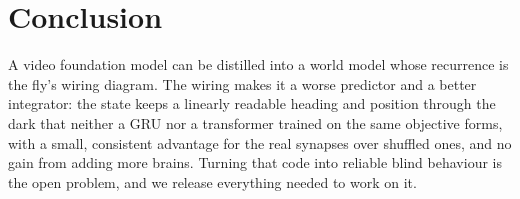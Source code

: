 \section{Conclusion}
A video foundation model can be distilled into a world model whose recurrence is the fly's wiring diagram. The wiring
makes it a worse predictor and a better integrator: the state keeps a linearly readable heading and position through
the dark that neither a GRU nor a transformer trained on the same objective forms, with a small, consistent advantage
for the real synapses over shuffled ones, and no gain from adding more brains. Turning that code into reliable blind
behaviour is the open problem, and we release everything needed to work on it.
